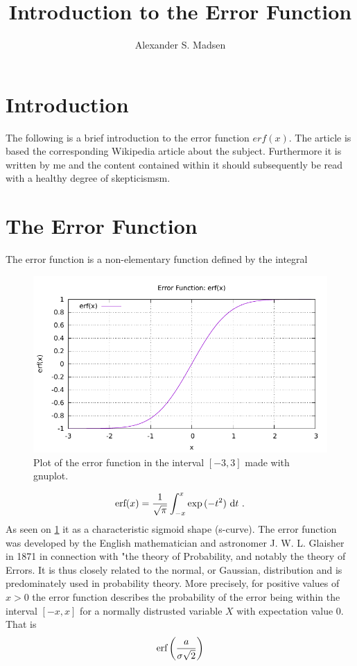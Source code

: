 \documentclass[11pt,a4paper]{article}
\begin{document}
\author{Alexander S. Madsen}
\title{Introduction to the Error Function}
\maketitle

\section{Introduction}
The following is a brief introduction to the error function $erf(x)$. The article is based the corresponding Wikipedia article about the subject. Furthermore it is written by me and the content contained within it should subsequently be read with a healthy degree of skepticismsm.

\section{The Error Function}
The error function is a non-elementary function defined by the integral
\begin{figure}[b!]
	\centering
	\includegraphics[]{figure.pdf}
	\caption{Plot of the error function in the interval $[-3,3]$ made with gnuplot.}
	\label{fig:erf}
\end{figure}
\begin{equation}
	\textup{erf}(x) = \frac{1}{\sqrt{\pi}} \int_{-x}^{x} \exp{(-t^2)}\ \textup{d}t\ .
\end{equation}
As seen on \ref{fig:erf} it as a characteristic sigmoid shape (s-curve). The error function was developed by the English mathematician and astronomer J. W. L. Glaisher in 1871 in connection with "the theory of Probability, and notably the theory of Errors. It is thus closely related to the normal, or Gaussian, distribution and is predominately used in probability theory. More precisely, for positive values of $x>0$ the error function describes the probability of the error being within the interval $[-x,x]$ for a normally distrusted variable $X$ with expectation value $0$. That is
\begin{equation}
\textup{erf} \left(\frac{a}{\sigma \sqrt{2}}\right)
\end{equation}
\end{document}

